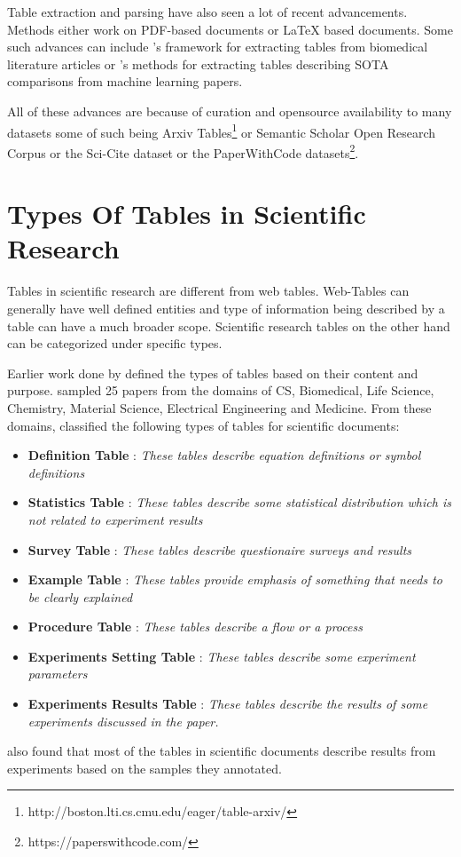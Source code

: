 Table extraction and parsing have also seen a lot of recent advancements. Methods either work on PDF-based documents or LaTeX based documents.  Some such advances can include \cite{milosevic2019framework}'s framework for extracting tables from biomedical literature articles or \cite{kardas2020axcell}'s methods for extracting tables describing SOTA comparisons from machine learning papers. 

All of these advances are because of curation and opensource availability to many datasets some of such being Arxiv Tables\footnote{http://boston.lti.cs.cmu.edu/eager/table-arxiv/} or Semantic Scholar Open Research Corpus\parencite{ammar-etal-2018-construction} or the Sci-Cite dataset \parencite{cohan2019structural} or the PaperWithCode datasets\footnote{https://paperswithcode.com/}.


\section{Types Of Tables in Scientific Research}
\label{relatedwork:table-type}
Tables in scientific research are different from web tables. Web-Tables can generally have well defined entities and type of information being described by a table can have a much broader scope. Scientific research tables on the other hand can be categorized under specific types. 

Earlier work done by \cite{kim2012scientific} defined the types of tables based on their content and purpose. \cite{kim2012scientific} sampled 25 papers from the domains of CS, Biomedical, Life Science, Chemistry, Material Science, Electrical Engineering and Medicine. From these domains, \cite{kim2012scientific} classified the following types of tables for scientific documents:
\begin{itemize}
    \item \textbf{Definition Table} : \textit{These tables describe equation definitions or symbol definitions}
    \item \textbf{Statistics Table} : \textit{These tables describe some statistical distribution which is not related to experiment results}
    \item \textbf{Survey Table } : \textit{These tables describe questionaire surveys and results }
    \item \textbf{Example Table } : \textit{These tables provide emphasis of something that needs to be clearly explained }
    \item \textbf{Procedure Table} : \textit{These tables describe a flow or a process}
    \item \textbf{Experiments Setting Table } : \textit{These tables describe some experiment parameters}
    \item \textbf{Experiments Results Table } : \textit{These tables describe the results of some experiments discussed in the paper.}
\end{itemize}

\cite{kim2012scientific} also found that most of the tables in scientific documents describe results from experiments based on the samples they annotated. 



